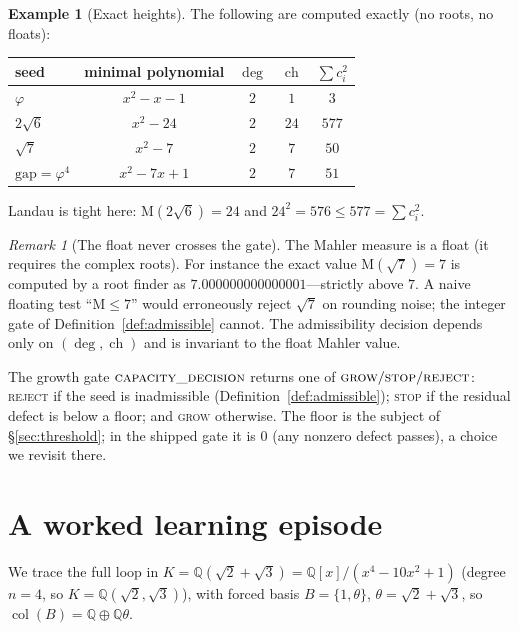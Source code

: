 \documentclass[11pt]{article}
\theoremstyle{plain}
\theoremstyle{definition}
\newtheorem{example}[theorem]{Example}
\theoremstyle{remark}
\newtheorem{remark}[theorem]{Remark}
\newcommand{\Q}{\mathbb{Q}}
\newcommand{\K}{K}
\newcommand{\Mah}{\mathrm{M}}
\newcommand{\BB}{B}
\DeclareMathOperator{\col}{col}
\begin{document}
\begin{example}[Exact heights]\label{ex:heights}
The following are computed exactly (no roots, no floats):
\begin{center}
\begin{tabular}{lcccc}
\toprule
seed & minimal polynomial & $\deg$ & $\operatorname{ch}$ & $\sum c_i^2$ \\
\midrule
$\varphi$ & $x^2-x-1$ & $2$ & $1$ & $3$ \\
$2\sqrt6$ & $x^2-24$ & $2$ & $24$ & $577$ \\
$\sqrt7$ & $x^2-7$ & $2$ & $7$ & $50$ \\
$\mathrm{gap}=\varphi^4$ & $x^2-7x+1$ & $2$ & $7$ & $51$ \\
\bottomrule
\end{tabular}
\end{center}
Landau is tight here: $\Mah(2\sqrt6)=24$ and $24^2=576\le 577=\sum c_i^2$.
\end{example}

\begin{remark}[The float never crosses the gate]\label{rem:floatgate}
The Mahler measure is a float (it requires the complex roots). For instance the exact value $\Mah(\sqrt7)=7$
is computed by a root finder as $7.000000000000001$---strictly above $7$. A naive floating test
``$\Mah\le 7$'' would erroneously reject $\sqrt7$ on rounding noise; the integer gate of
Definition~\ref{def:admissible} cannot. The admissibility decision depends only on
$(\deg,\operatorname{ch})$ and is invariant to the float Mahler value.
\end{remark}

The growth gate $\textsc{capacity\_decision}$ returns one of $\textsc{grow}/\textsc{stop}/\textsc{reject}$:
\textsc{reject} if the seed is inadmissible (Definition~\ref{def:admissible}); \textsc{stop} if the residual
defect is below a floor; and \textsc{grow} otherwise. The floor is the subject of \S\ref{sec:threshold}; in
the shipped gate it is $0$ (any nonzero defect passes), a choice we revisit there.

\section{A worked learning episode}\label{sec:episode}
We trace the full loop in $\K=\Q(\sqrt2+\sqrt3)=\Q[x]/(x^4-10x^2+1)$ (degree $n=4$, so
$\K=\Q(\sqrt2,\sqrt3)$), with forced basis $\BB=\{1,\theta\}$, $\theta=\sqrt2+\sqrt3$, so
$\col(\BB)=\Q\oplus\Q\theta$.
\end{document}
